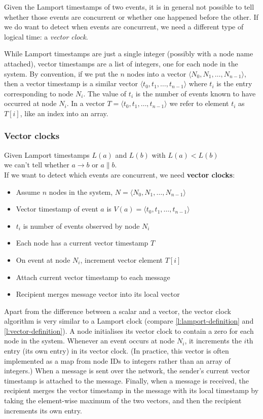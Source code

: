 Given the Lamport timestamps of two events, it is in general not possible to tell whether those events are concurrent or whether one happened before the other.
If we do want to detect when events are concurrent, we need a different type of logical time: a \emph{vector clock}.

While Lamport timestamps are just a single integer (possibly with a node name attached), vector timestamps are a list of integers, one for each node in the system.
By convention, if we put the $n$ nodes into a vector $\langle N_0, N_1, \dots, N_{n-1} \rangle$, then a vector timestamp is a similar vector $\langle t_0, t_1, \dots, t_{n-1} \rangle$ where $t_i$ is the entry corresponding to node $N_i$.
The value of $t_i$ is the number of events known to have occurred at node $N_i$.
In a vector $T = \langle t_0, t_1, \dots, t_{n-1} \rangle$ we refer to element $t_i$ as $T[i]$, like an index into an array.

\begin{frame}
    \label{s:vector-clocks}
    \frametitle{Vector clocks}
    Given Lamport timestamps $L(a)$ and $L(b)$ with $L(a) < L(b)$\\we can't tell whether $a \rightarrow b$ or $a \parallel b$.\\[1em]
    If we want to detect which events are concurrent, we need \textbf{vector clocks}:\pause
    \begin{itemize}
        \item Assume $n$ nodes in the system, $N = \langle N_0, N_1, \dots, N_{n-1} \rangle$\pause
        \item Vector timestamp of event $a$ is $V(a) = \langle t_0, t_1, \dots, t_{n-1}\rangle$
        \item $t_i$ is number of events observed by node $N_i$\pause
        \item Each node has a current vector timestamp $T$
        \item On event at node $N_i$, increment vector element $T[i]$\pause
        \item Attach current vector timestamp to each message
        \item Recipient merges message vector into its local vector
    \end{itemize}
\end{frame}
\label{l:vector-clocks}

Apart from the difference between a scalar and a vector, the vector clock algorithm is very similar to a Lamport clock (compare \autoref{l:lamport-definition} and \autoref{l:vector-definition}).
A node initialises its vector clock to contain a zero for each node in the system.
Whenever an event occurs at node $N_i$, it increments the $i$th entry (its own entry) in its vector clock.
(In practice, this vector is often implemented as a map from node IDs to integers rather than an array of integers.)
When a message is sent over the network, the sender's current vector timestamp is attached to the message.
Finally, when a message is received, the recipient merges the vector timestamp in the message with its local timestamp by taking the element-wise maximum of the two vectors, and then the recipient increments its own entry.

